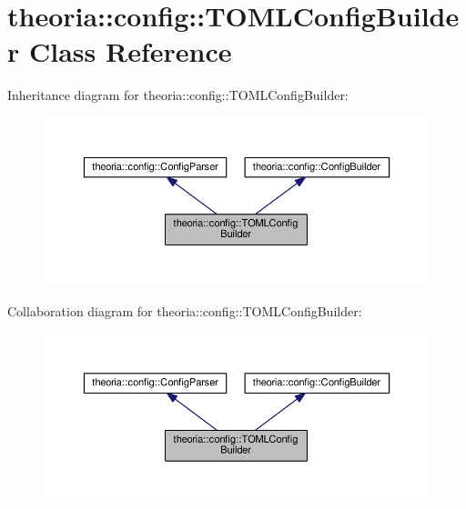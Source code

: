 \hypertarget{classtheoria_1_1config_1_1TOMLConfigBuilder}{}\section{theoria\+:\+:config\+:\+:T\+O\+M\+L\+Config\+Builder Class Reference}
\label{classtheoria_1_1config_1_1TOMLConfigBuilder}


Inheritance diagram for theoria\+:\+:config\+:\+:T\+O\+M\+L\+Config\+Builder\+:
\nopagebreak
\begin{figure}[H]
\begin{center}
\leavevmode
\includegraphics[width=350pt]{classtheoria_1_1config_1_1TOMLConfigBuilder__inherit__graph}
\end{center}
\end{figure}


Collaboration diagram for theoria\+:\+:config\+:\+:T\+O\+M\+L\+Config\+Builder\+:
\nopagebreak
\begin{figure}[H]
\begin{center}
\leavevmode
\includegraphics[width=350pt]{classtheoria_1_1config_1_1TOMLConfigBuilder__coll__graph}
\end{center}
\end{figure}
